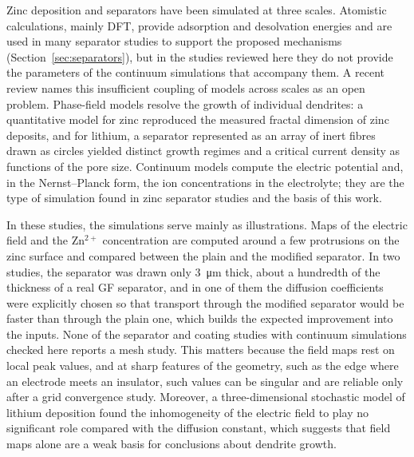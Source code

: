 Zinc deposition and separators have been simulated at three scales.
Atomistic calculations, mainly DFT, provide adsorption and desolvation energies and are used in many separator studies to support the proposed mechanisms (Section~\ref{sec:separators}), but in the studies reviewed here they do not provide the parameters of the continuum simulations that accompany them\cite{gou_seaweed-inspired_2025}.
A recent review names this insufficient coupling of models across scales as an open problem\cite{zheng_interface_2026}.
Phase-field models resolve the growth of individual dendrites: a quantitative model for zinc reproduced the measured fractal dimension of zinc deposits\cite{cogswell_quantitative_2015}, and for lithium, a separator represented as an array of inert fibres drawn as circles yielded distinct growth regimes and a critical current density as functions of the pore size\cite{jana_dendrite-separator_2015}.
Continuum models compute the electric potential and, in the Nernst--Planck form, the ion concentrations in the electrolyte\cite{gou_seaweed-inspired_2025}; they are the type of simulation found in zinc separator studies and the basis of this work.

In these studies, the simulations serve mainly as illustrations.
Maps of the electric field and the Zn$^{2+}$ concentration are computed around a few protrusions on the zinc surface and compared between the plain and the modified separator\cite{gou_seaweed-inspired_2025}.
In two studies, the separator was drawn only \SI{3}{\um} thick\cite{su_printingscalable_2022,su_yiwen_2023,gou_seaweed-inspired_2025}, about a hundredth of the thickness of a real GF separator, and in one of them the diffusion coefficients were explicitly chosen so that transport through the modified separator would be faster than through the plain one\cite{gou_seaweed-inspired_2025}, which builds the expected improvement into the inputs.
None of the separator and coating studies with continuum simulations checked here reports a mesh study.
This matters because the field maps rest on local peak values, and at sharp features of the geometry, such as the edge where an electrode meets an insulator, such values can be singular and are reliable only after a grid convergence study\cite{shah_editors_2020}.
Moreover, a three-dimensional stochastic model of lithium deposition found the inhomogeneity of the electric field to play no significant role compared with the diffusion constant\cite{jang_effect_2021}, which suggests that field maps alone are a weak basis for conclusions about dendrite growth.

